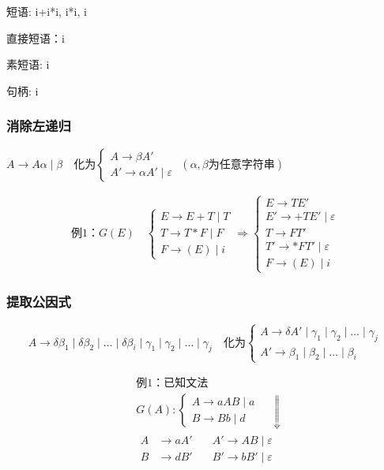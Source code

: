 短语: i+i*i, i*i, i \par
直接短语：i \par
素短语: i \par
句柄: i \par

\subsubsection*{消除左递归}

\( A \to A\alpha \mid \beta \quad \text{化为}
\begin{cases}
A \to \beta A' \\
A' \to \alpha A' \mid \varepsilon
\end{cases} \)
\hspace{3cm}
\( (\alpha,\beta \text{为任意字符串}) \)
 \par

\[
\begin{aligned}
\text{例1：}G(E)\quad
\begin{cases}
E\to E+T\mid T\\
T\to T*F\mid F\\
F\to (E)\mid i
\end{cases}
\Rightarrow
\begin{cases}
E\to TE' \\
E'\to +TE'\mid \varepsilon \\
T\to FT' \\
T'\to *FT'\mid \varepsilon \\
F\to (E)\mid i
\end{cases}
\end{aligned}
\]

\subsubsection*{提取公因式}

\[
A \to \delta\beta_1 \mid \delta\beta_2 \mid \dots \mid \delta\beta_i \mid \gamma_1 \mid \gamma_2 \mid \dots \mid \gamma_j
\quad \text{化为}
\begin{cases}
A \to \delta A' \mid \gamma_1 \mid \gamma_2 \mid \dots \mid \gamma_j \\
A' \to \beta_1 \mid \beta_2 \mid \dots \mid \beta_i
\end{cases}
\]


\[
\begin{aligned}
&\text{例1：已知文法} \\
&G(A):
\begin{cases}
A \to aAB \mid a \\
B \to Bb \mid d
\end{cases}
\quad\Downarrow\\[6pt]
&\begin{aligned}
A &\to aA' \quad &A' \to AB \mid \varepsilon \\
B &\to dB' \quad &B' \to bB' \mid \varepsilon
\end{aligned}
\end{aligned}
\]

